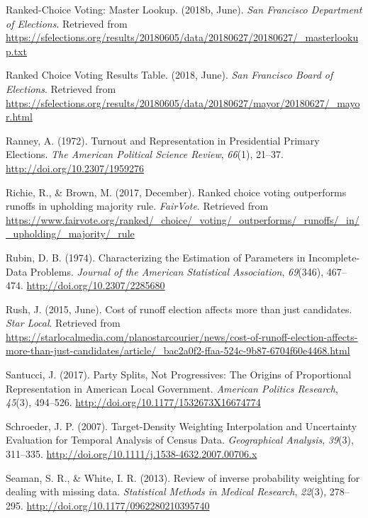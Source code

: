 \documentclass[12pt,twoside]{reedthesis}
\begin{document}
\leavevmode\hypertarget{ref-noauthor_ranked-choice_2018}{}%
Ranked-Choice Voting: Master Lookup. (2018b, June). \emph{San Francisco Department of Elections}. Retrieved from \url{https://sfelections.org/results/20180605/data/20180627/20180627/_masterlookup.txt}

\leavevmode\hypertarget{ref-noauthor_ranked_2018}{}%
Ranked Choice Voting Results Table. (2018, June). \emph{San Francisco Board of Elections}. Retrieved from \url{https://sfelections.org/results/20180605/data/20180627/mayor/20180627/_mayor.html}

\leavevmode\hypertarget{ref-ranney_turnout_1972}{}%
Ranney, A. (1972). Turnout and Representation in Presidential Primary Elections. \emph{The American Political Science Review}, \emph{66}(1), 21--37. \url{http://doi.org/10.2307/1959276}

\leavevmode\hypertarget{ref-richie_ranked_2017}{}%
Richie, R., \& Brown, M. (2017, December). Ranked choice voting outperforms runoffs in upholding majority rule. \emph{FairVote}. Retrieved from \url{https://www.fairvote.org/ranked/_choice/_voting/_outperforms/_runoffs/_in/_upholding/_majority/_rule}

\leavevmode\hypertarget{ref-rubin_characterizing_1974}{}%
Rubin, D. B. (1974). Characterizing the Estimation of Parameters in Incomplete-Data Problems. \emph{Journal of the American Statistical Association}, \emph{69}(346), 467--474. \url{http://doi.org/10.2307/2285680}

\leavevmode\hypertarget{ref-rush_cost_2015}{}%
Rush, J. (2015, June). Cost of runoff election affects more than just candidates. \emph{Star Local}. Retrieved from \url{https://starlocalmedia.com/planostarcourier/news/cost-of-runoff-election-affects-more-than-just-candidates/article/_bac2a0f2-ffaa-524c-9b87-6704f60e4468.html}

\leavevmode\hypertarget{ref-santucci_party_2017}{}%
Santucci, J. (2017). Party Splits, Not Progressives: The Origins of Proportional Representation in American Local Government. \emph{American Politics Research}, \emph{45}(3), 494--526. \url{http://doi.org/10.1177/1532673X16674774}

\leavevmode\hypertarget{ref-schroeder_target-density_2007}{}%
Schroeder, J. P. (2007). Target-Density Weighting Interpolation and Uncertainty Evaluation for Temporal Analysis of Census Data. \emph{Geographical Analysis}, \emph{39}(3), 311--335. \url{http://doi.org/10.1111/j.1538-4632.2007.00706.x}

\leavevmode\hypertarget{ref-seaman_review_2013}{}%
Seaman, S. R., \& White, I. R. (2013). Review of inverse probability weighting for dealing with missing data. \emph{Statistical Methods in Medical Research}, \emph{22}(3), 278--295. \url{http://doi.org/10.1177/0962280210395740}
\end{document}
